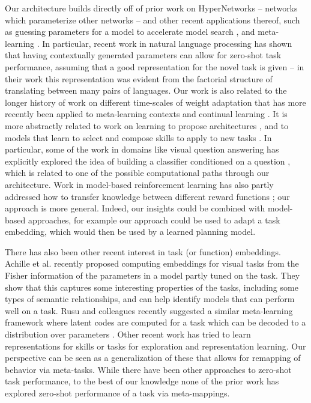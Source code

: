 \documentclass{article}
\begin{document}
Our architecture builds directly off of prior work on HyperNetworks \citep{Ha2016} -- networks which parameterize other networks -- and other recent applications thereof, such as guessing parameters for a model to accelerate model search \citep[e.g.][]{Brock2018a, Zhang2019}, and meta-learning \citep[e.g.]{Li2019a, Rusu2019}. In particular, recent work in natural language processing has shown that having contextually generated parameters can allow for zero-shot task performance, assuming that a good representation for the novel task is given \citep{Platanios2017} -- in their work this representation was evident from the factorial structure of translating between many pairs of languages. Our work is also related to the longer history of work on different time-scales of weight adaptation \citep{Hinton1982, Kumaran2016} that has more recently been applied to meta-learning contexts \citep[e.g.][]{Ba2016, Munkhdalai2017, Garnelo2018} and continual learning \citep[e.g.]{Hu2019}. It is more abstractly related to work on learning to propose architectures \citep[e.g.][]{Zoph2016, Cao2019}, and to models that learn to select and compose skills to apply to new tasks \citep[e.g.][]{Andreas, Andreas2016, Tessler2016, Reed2015, Chang2019a}. In particular, some of the work in domains like visual question answering has explicitly explored the idea of building a classifier conditioned on a question \citep{Andreas, Andreasa}, which is related to one of the possible computational paths through our architecture. Work in model-based reinforcement learning has also partly addressed how to transfer knowledge between different reward functions \citep[e.g.][]{Laroche2017}; our approach is more general. Indeed, our insights could be combined with model-based approaches, for example our approach could be used to adapt a task embedding, which would then be used by a learned planning model.\par 
There has also been other recent interest in task (or function) embeddings. Achille et al. \citep{Achille2019} recently proposed computing embeddings for visual tasks from the Fisher information of the parameters in a model partly tuned on the task. They show that this captures some interesting properties of the tasks, including some types of semantic relationships, and can help identify models that can perform well on a task. Rusu and colleagues recently suggested a similar meta-learning framework where latent codes are computed for a task which can be decoded to a distribution over parameters \citep{Rusu2019}. Other recent work has tried to learn representations for skills \citep[e.g.][]{Eysenbach2019} or tasks \citep[e.g.]{Hsu2019} for exploration and representation learning. Our perspective can be seen as a generalization of these that allows for remapping of behavior via meta-tasks. While there have been other approaches to zero-shot task performance, to the best of our knowledge none of the prior work has explored zero-shot performance of a task via meta-mappings. \par
\vspace{-1em}
\end{document}
